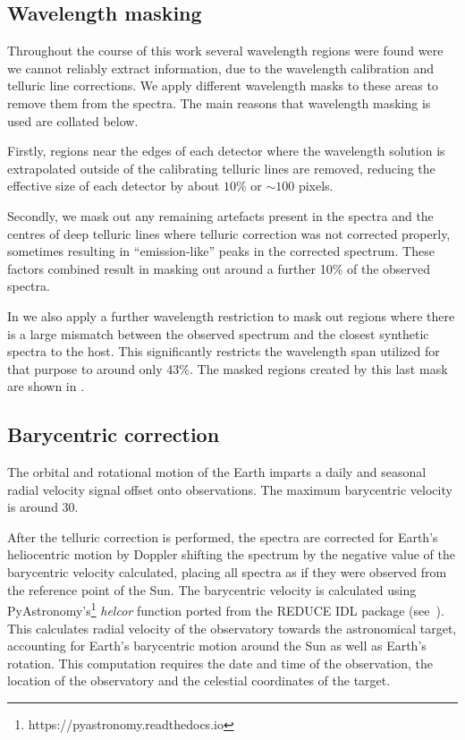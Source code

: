\subsection{Wavelength masking}
Throughout the course of this work several wavelength regions were found were we cannot reliably extract information, due to the wavelength calibration and telluric line corrections.
We apply different wavelength masks to these areas to remove them from the spectra.
The main reasons that wavelength masking is used are collated below.

Firstly, regions near the edges of each detector where the wavelength solution is extrapolated outside of the calibrating telluric lines are removed, reducing the effective size of each detector by about \(10\%\) or \(\sim100\) pixels.

Secondly, we mask out any remaining artefacts present in the spectra and the centres of deep telluric lines where telluric correction was not corrected properly, sometimes resulting in ``emission-like'' peaks in the corrected spectrum.
These factors combined result in masking out around a further 10\% of the observed spectra.

In  we also apply a further wavelength restriction to mask out regions where there is a large mismatch between the observed spectrum and the closest synthetic spectra to the host.
This significantly restricts the wavelength span utilized for that purpose to around only 43\%.
The masked regions created by this last mask are shown in .




\subsection{Barycentric correction}
The orbital and rotational motion of the Earth imparts a daily and seasonal radial velocity signal offset onto observations.
The maximum barycentric velocity is around 30\kmps{}.

After the telluric correction is performed, the spectra are corrected for Earth's heliocentric motion by Doppler shifting the spectrum by the negative value of the barycentric velocity calculated, placing all spectra as if they were observed from the reference point of the Sun.
The barycentric velocity is calculated using PyAstronomy's\footnote{https://pyastronomy.readthedocs.io} \emph{helcor} function ported from the REDUCE IDL package (see~\citet[][]{piskunov_new_2002}).
This calculates radial velocity of the observatory towards the astronomical target, accounting for Earth's barycentric motion around the Sun as well as Earth's rotation.
This computation requires the date and time of the observation, the location of the observatory and the celestial coordinates of the target.
